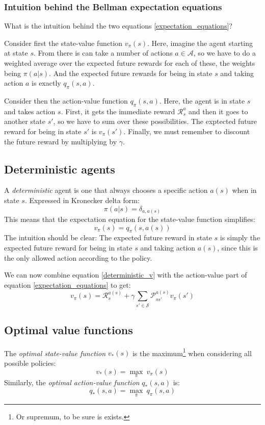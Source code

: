 \documentclass[12pt, a4paper]{article}
\numberwithin{equation}{section}
\begin{document}
\subsubsection{Intuition behind the Bellman expectation equations}
What is the intuition behind the two equations \ref{expectation_equations}?

Consider first the state-value function $v_\pi(s)$. Here, imagine the agent starting at state $s$. From there is can take a number of actions $a\in\mathcal{A}$, so we have to do a weighted average over the expected future rewards for each of these, the weights being $\pi(a|s)$. And the expected future rewards for being in state $s$ and taking action $a$ is exactly $q_\pi(s,a)$.

Consider then the action-value function $q_\pi(s,a)$. Here, the agent is in state $s$ and takes action $s$. First, it gets the immediate reward $\mathcal{R}^a_s$ and then it goes to another state $s'$, so we have to sum over these possibilities. The exptected future reward for being in state $s'$ is $v_\pi(s')$. Finally, we must remember to discount the future reward by multiplying by $\gamma$.

\subsection{Deterministic agents}
A \textit{deterministic} agent is one that always chooses a specific action $a(s)$ when in state $s$. Expressed in Kronecker delta form:
\begin{equation}
\pi(a|s)=\delta_{a,a(s)}
\end{equation}
This means that the expectation equation for the state-value function simplifies:
\begin{equation}
v_\pi(s)=q_\pi(s,a(s))
\label{deterministic_v}
\end{equation}
The intuition should be clear: The expected future reward in state $s$ is simply the expected future reward for being in state $s$ and taking action $a(s)$, since this is the only allowed action according to the policy.

We can now combine equation \ref{deterministic_v} with the action-value part of equation \ref{expectation_equations} to get:
\begin{equation}
v_\pi(s)=\mathcal{R}^{a(s)}_s+\gamma\sum_{s'\in\mathcal{S}}\mathcal{P}^{a(s)}_{ss'}v_\pi(s')
\end{equation}

\subsection{Optimal value functions}
The \textit{optimal state-value function} $v_*(s)$ is the maximum\footnote{Or supremum, to be sure is exists.} when considering all possible policies:
\begin{equation}
v_*(s)=\underset{\pi}{\max}\ v_\pi(s)
\end{equation}
Similarly, the \textit{optimal action-value function} $q_*(s,a)$ is:
\begin{equation}
q_*(s,a)=\underset{\pi}{\max}\ q_\pi(s,a)
\end{equation}
\end{document}
